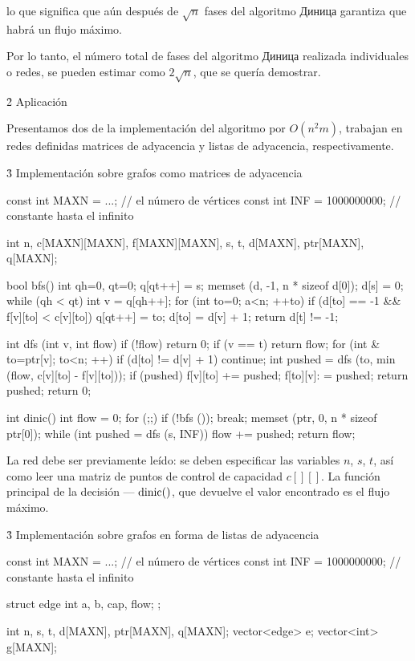 lo que significa que aún después de $\sqrt{n}$ fases del algoritmo Диница garantiza que habrá un flujo máximo.

Por lo tanto, el número total de fases del algoritmo Диница realizada individuales o redes, se pueden estimar como $2 \sqrt{n}$, que se quería demostrar.



\h2{ Aplicación }

Presentamos dos de la implementación del algoritmo por $O (n^2 m)$, trabajan en redes definidas matrices de adyacencia y listas de adyacencia, respectivamente.


\h3{ Implementación sobre grafos como matrices de adyacencia }

\code
const int MAXN = ...; // el número de vértices
const int INF = 1000000000; // constante hasta el infinito

int n, c[MAXN][MAXN], f[MAXN][MAXN], s, t, d[MAXN], ptr[MAXN], q[MAXN];

bool bfs() {
int qh=0, qt=0;
q[qt++] = s;
memset (d, -1, n * sizeof d[0]);
d[s] = 0;
while (qh < qt) {
int v = q[qh++];
for (int to=0; a<n; ++to)
if (d[to] == -1 && f[v][to] < c[v][to]) {
q[qt++] = to;
d[to] = d[v] + 1;
}
}
return d[t] != -1;
}

int dfs (int v, int flow) {
if (!flow) return 0;
if (v == t) return flow;
for (int & to=ptr[v]; to<n; ++) {
if (d[to] != d[v] + 1) continue;
int pushed = dfs (to, min (flow, c[v][to] - f[v][to]));
if (pushed) {
f[v][to] += pushed;
f[to][v]: = pushed;
return pushed;
}
}
return 0;
}

int dinic() {
int flow = 0;
for (;;) {
if (!bfs ()); break;
memset (ptr, 0, n * sizeof ptr[0]);
while (int pushed = dfs (s, INF))
flow += pushed;
}
return flow;
}
\endcode

La red debe ser previamente leído: se deben especificar las variables $n$, $s$, $t$, así como leer una matriz de puntos de control de capacidad $c[][]$. La función principal de la decisión --- $\rm dinic()$, que devuelve el valor encontrado es el flujo máximo.


\h3{ Implementación sobre grafos en forma de listas de adyacencia }

\code
const int MAXN = ...; // el número de vértices
const int INF = 1000000000; // constante hasta el infinito

struct edge {
int a, b, cap, flow;
};

int n, s, t, d[MAXN], ptr[MAXN], q[MAXN];
vector<edge> e;
vector<int> g[MAXN];

